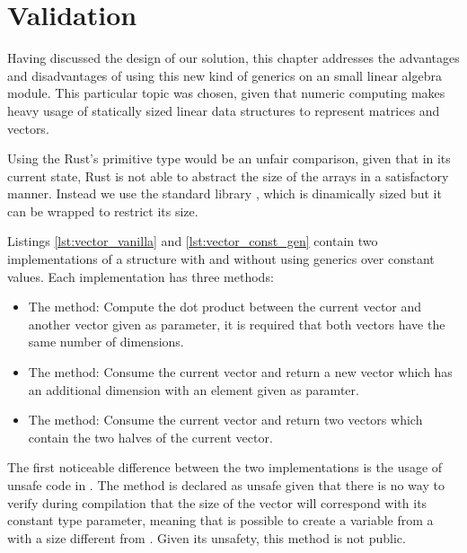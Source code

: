 \chapter{Validation}
\label{chap:validation}

Having discussed the design of our solution, this chapter addresses the
advantages and disadvantages of using this new kind of generics on an small
linear algebra module. This particular topic was chosen, given that numeric
computing makes heavy usage of statically sized linear data structures to
represent matrices and vectors.

Using the Rust's  primitive type would be an unfair comparison,
given that in its current state, Rust is not able to abstract the size of the
arrays in a satisfactory manner. Instead we use the standard library
, which is dinamically sized but it can be wrapped to restrict its
size.

Listings \ref{lst:vector_vanilla} and \ref{lst:vector_const_gen} contain two
implementations of a  structure with and without using generics
over constant values. Each implementation has three methods:

\begin{itemize}
    \item The  method: Compute the dot product between the current
        vector and another vector given as parameter, it is required that both
        vectors have the same number of dimensions.  
    \item The  method: Consume the current vector and return a
        new vector which has an additional dimension with an element given as
        paramter.  
    \item The  method: Consume the current vector and return two
        vectors which contain the two halves of the current vector.  
\end{itemize}

The first noticeable difference between the two implementations is the usage of
unsafe code in . The  method is
declared as unsafe given that there is no way to verify during compilation that
the size of the vector will correspond with its constant type parameter,
meaning that is possible to create a  variable from a
 with a size different from . Given its unsafety, this
method is not public.

